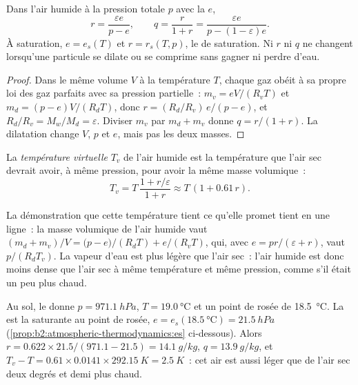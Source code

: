 \begin{proposition}\label{prop:b2:atmospheric-thermodynamics:humidity}
Dans l'air humide à la pression totale $p$ avec la  $e$,
\[
  r = \frac{\varepsilon e}{p - e}, \qquad q = \frac{r}{1 + r} = \frac{\varepsilon e}{p - (1 -
  \varepsilon)e} .
\]
À saturation, $e = e_s(T)$ et $r = r_s(T, p)$, le  de saturation. Ni $r$ ni
$q$ ne changent lorsqu'une particule se dilate ou se comprime sans gagner ni perdre d'eau.
\end{proposition}

\begin{proof}
Dans le même volume $V$ à la température $T$, chaque gaz obéit à sa propre loi des gaz
parfaits avec sa pression partielle~: $m_v = eV/(R_vT)$ et $m_d = (p - e)V/(R_dT)$, donc
$r = (R_d/R_v)\,e/(p - e)$, et $R_d/R_v = M_w/M_d = \varepsilon$. Diviser $m_v$ par $m_d + m_v$
donne $q = r/(1 + r)$. La dilatation change $V$, $p$ et $e$, mais pas les deux masses.
\end{proof}

\begin{definition}\label{def:b2:atmospheric-thermodynamics:virtual}
La \emph{température virtuelle} $T_v$ de l'air humide est la
température que l'air sec devrait avoir, à même pression, pour avoir la même masse volumique~:
\[
  T_v = T\,\frac{1 + r/\varepsilon}{1 + r} \approx T\,(1 + 0.61\,r) .
\]
\end{definition}

La démonstration que cette température tient ce qu'elle promet tient en une ligne~: la masse volumique
de l'air humide vaut $(m_d + m_v)/V = \bigl(p - e\bigr)/(R_dT) + e/(R_vT)$, qui, avec
$e = pr/(\varepsilon + r)$, vaut $p/(R_dT_v)$. La vapeur d'eau est plus légère que l'air sec~: l'air humide est donc
moins dense que l'air sec à même température et même pression, comme s'il était un peu plus chaud.

\begin{example}\label{ex:b2:atmospheric-thermodynamics:norman}
Au sol, le  donne $p = \qty{971.1}{hPa}$, $T = \qty{19.0}{\celsius}$ et un point
de rosée de \qty{18.5}{\celsius}. La  est la  saturante
au point de rosée, $e = e_s(\qty{18.5}{\celsius}) = \qty{21.5}{hPa}$
(\cref{prop:b2:atmospheric-thermodynamics:es} ci-dessous). Alors $r = 0.622 \times 21.5/(971.1 - 21.5) = \qty{14.1}{g/kg}$,
$q = \qty{13.9}{g/kg}$, et $T_v - T = 0.61 \times 0.0141 \times \qty{292.15}{K} = \qty{2.5}{K}$~:
cet air est aussi léger que de l'air sec deux degrés et demi plus chaud.
\end{example}

